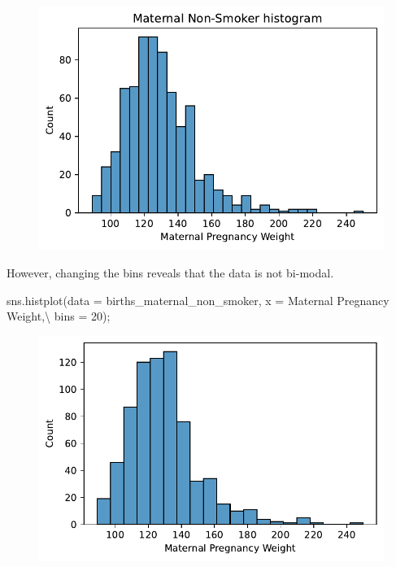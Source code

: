 \documentclass[
  letterpaper,
  DIV=11,
  numbers=noendperiod]{scrreprt}
\newenvironment{Shaded}{\begin{snugshade}}{\end{snugshade}}
\newcommand{\DecValTok}[1]{\textcolor[rgb]{0.68,0.00,0.00}{#1}}
\newcommand{\NormalTok}[1]{\textcolor[rgb]{0.00,0.23,0.31}{#1}}
\newcommand{\OperatorTok}[1]{\textcolor[rgb]{0.37,0.37,0.37}{#1}}
\newcommand{\StringTok}[1]{\textcolor[rgb]{0.13,0.47,0.30}{#1}}
\begin{document}
\begin{figure}[H]

{\centering \includegraphics{visualization_1/visualization_1_files/figure-pdf/cell-14-output-1.pdf}

}

\end{figure}

However, changing the bins reveals that the data is not bi-modal.

\begin{Shaded}
\begin{Highlighting}[]
\NormalTok{sns.histplot(data }\OperatorTok{=}\NormalTok{ births\_maternal\_non\_smoker, x }\OperatorTok{=} \StringTok{\textquotesingle{}Maternal Pregnancy Weight\textquotesingle{}}\NormalTok{,}\OperatorTok{\textbackslash{}}
\NormalTok{             bins }\OperatorTok{=} \DecValTok{20}\NormalTok{)}\OperatorTok{;}
\end{Highlighting}
\end{Shaded}

\begin{figure}[H]

{\centering \includegraphics{visualization_1/visualization_1_files/figure-pdf/cell-15-output-1.pdf}

}

\end{figure}
\end{document}
